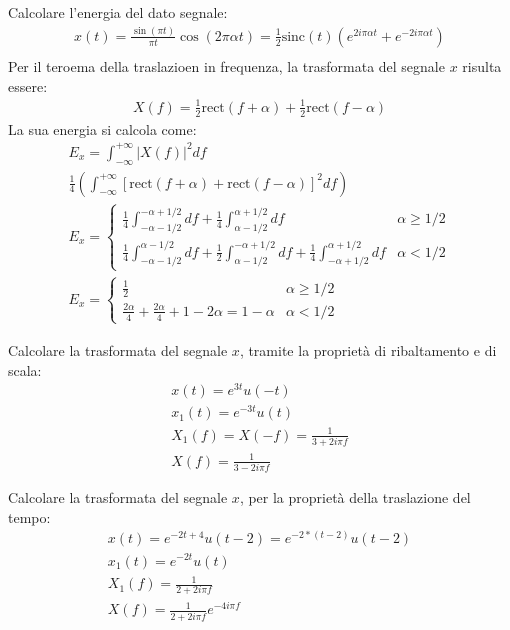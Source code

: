 \documentclass{article}
\numberwithin{equation}{subsection}
\begin{document}
Calcolare l'energia del dato segnale:
\begin{gather*}
    x(t)=\displaystyle\frac{\sin(\pi t)}{\pi t}\cos(2\pi \alpha t)=\frac{1}{2}\mbox{sinc}(t)(e^{2i\pi\alpha t}+e^{-2i\pi\alpha t})\\
\end{gather*}
Per il teroema della traslazioen in frequenza, la trasformata del segnale $x$ risulta essere:
\begin{gather*}
    X(f)=\displaystyle\frac{1}{2}\mbox{rect}(f+\alpha)+\frac{1}{2}\mbox{rect}(f-\alpha)
\end{gather*}
La sua energia si calcola come:
\begin{gather*}
    E_x=\displaystyle\int_{-\infty}^{+\infty}|X(f)|^2df\\
    \displaystyle\frac{1}{4}\left(\int_{-\infty}^{+\infty}\left[\mbox{rect}(f+\alpha)+\mbox{rect}(f-\alpha)\right]^2df\right)\\
    E_x=\begin{cases}
        \displaystyle\frac{1}{4}\int_{-\alpha-1/2}^{-\alpha+1/2}df+\frac{1}{4}\int_{\alpha-1/2}^{\alpha+1/2}df& \alpha\geq1/2\\
        \displaystyle\frac{1}{4}\int_{-\alpha-1/2}^{\alpha-1/2}df+\frac{1}{2}\int_{\alpha-1/2}^{-\alpha+1/2}df+\frac{1}{4}\int_{-\alpha+1/2}^{\alpha+1/2}df&\alpha<1/2
    \end{cases}\\
    E_x=\begin{cases}
        \displaystyle\frac{1}{2}&\alpha\geq1/2\\
        \displaystyle\frac{2\alpha}{4}+\frac{2\alpha}{4}+1-2\alpha=1-\alpha&\alpha<1/2
    \end{cases}
\end{gather*}


Calcolare la trasformata del segnale $x$, tramite la proprietà di ribaltamento e di scala: 
\begin{gather*}
    x(t)=e^{3t}u(-t)\\
    x_1(t)=e^{-3t}u(t)\\
    X_1(f)=X(-f)=\displaystyle\frac{1}{3+2i\pi f}\\
    X(f)=\displaystyle\frac{1}{3-2i\pi f}
\end{gather*}


Calcolare la trasformata del segnale $x$, per la proprietà della traslazione del tempo:
\begin{gather*}
    x(t)=e^{-2t+4}u(t-2)=e^{-2*(t-2)}u(t-2)\\
    x_1(t)=e^{-2t}u(t)\\
    X_1(f)=\displaystyle\frac{1}{2+2i\pi f}\\
    X(f)=\displaystyle\frac{1}{2+2i\pi f}e^{-4i\pi f}
\end{gather*}
\end{document}
